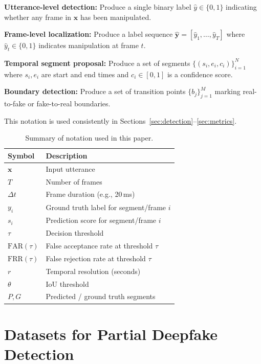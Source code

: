 \documentclass[journal]{IEEEtran}
\begin{document}
\textbf{Utterance-level detection:} Produce a single binary label $\hat{y} \in \{0, 1\}$ indicating whether any frame in $\mathbf{x}$ has been manipulated.

\textbf{Frame-level localization:} Produce a label sequence $\hat{\mathbf{y}} = [\hat{y}_1, \ldots, \hat{y}_T]$ where $\hat{y}_t \in \{0, 1\}$ indicates manipulation at frame $t$.

\textbf{Temporal segment proposal:} Produce a set of segments $\{(s_i, e_i, c_i)\}_{i=1}^{N}$ where $s_i, e_i$ are start and end times and $c_i \in [0,1]$ is a confidence score.

\textbf{Boundary detection:} Produce a set of transition points $\{b_j\}_{j=1}^{M}$ marking real-to-fake or fake-to-real boundaries.

This notation is used consistently in Sections~\ref{sec:detection}--\ref{sec:metrics}.

\begin{table}[h]
\centering
\caption{Summary of notation used in this paper.}
\label{tab:notation}
\small
\begin{tabular}{ll}
\toprule
\textbf{Symbol} & \textbf{Description} \\
\midrule
$\mathbf{x}$ & Input utterance \\
$T$ & Number of frames \\
$\Delta t$ & Frame duration (e.g., 20\,ms) \\
$y_i$ & Ground truth label for segment/frame $i$ \\
$s_i$ & Prediction score for segment/frame $i$ \\
$\tau$ & Decision threshold \\
$\text{FAR}(\tau)$ & False acceptance rate at threshold $\tau$ \\
$\text{FRR}(\tau)$ & False rejection rate at threshold $\tau$ \\
$r$ & Temporal resolution (seconds) \\
$\theta$ & IoU threshold \\
$P, G$ & Predicted / ground truth segments \\
\bottomrule
\end{tabular}
\end{table}

\section{Datasets for Partial Deepfake Detection}
\label{sec:datasets}
\end{document}
